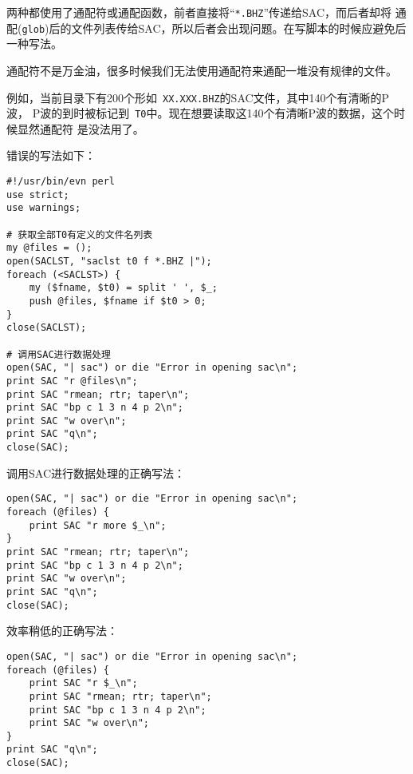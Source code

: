 两种都使用了通配符或通配函数，前者直接将``\verb+*.BHZ+''传递给SAC，而后者却将
通配(\verb+glob+)后的文件列表传给SAC，所以后者会出现问题。在写脚本的时候应避免后
一种写法。

通配符不是万金油，很多时候我们无法使用通配符来通配一堆没有规律的文件。

例如，当前目录下有200个形如~\verb+XX.XXX.BHZ+的SAC文件，其中140个有清晰的P波，
P波的到时被标记到~\verb+T0+中。现在想要读取这140个有清晰P波的数据，这个时候显然通配符
是没法用了。

错误的写法如下：
\begin{verbatim}
#!/usr/bin/evn perl
use strict;
use warnings;

# 获取全部T0有定义的文件名列表
my @files = ();
open(SACLST, "saclst t0 f *.BHZ |");
foreach (<SACLST>) {
    my ($fname, $t0) = split ' ', $_;
    push @files, $fname if $t0 > 0;
}
close(SACLST);

# 调用SAC进行数据处理
open(SAC, "| sac") or die "Error in opening sac\n";
print SAC "r @files\n";
print SAC "rmean; rtr; taper\n";
print SAC "bp c 1 3 n 4 p 2\n";
print SAC "w over\n";
print SAC "q\n";
close(SAC);
\end{verbatim}

调用SAC进行数据处理的正确写法：
\begin{verbatim}
open(SAC, "| sac") or die "Error in opening sac\n";
foreach (@files) {
    print SAC "r more $_\n";
}
print SAC "rmean; rtr; taper\n";
print SAC "bp c 1 3 n 4 p 2\n";
print SAC "w over\n";
print SAC "q\n";
close(SAC);
\end{verbatim}

效率稍低的正确写法：
\begin{verbatim}
open(SAC, "| sac") or die "Error in opening sac\n";
foreach (@files) {
    print SAC "r $_\n";
    print SAC "rmean; rtr; taper\n";
    print SAC "bp c 1 3 n 4 p 2\n";
    print SAC "w over\n";
}
print SAC "q\n";
close(SAC);
\end{verbatim}
